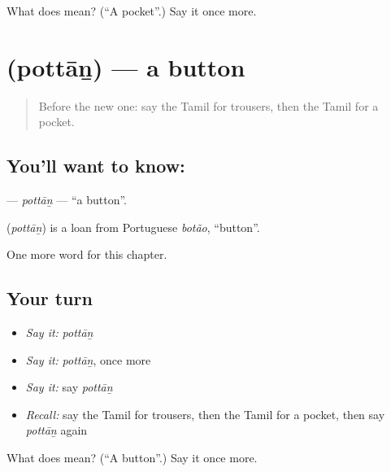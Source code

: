 \begin{tcolorbox}[breakable,colback=teal!4,colframe=teal!35!black,title={Before you move on}]
What does  mean? (\textquotedblleft{}A pocket\textquotedblright{}.) Say it once more.
\end{tcolorbox}
\section[\texorpdfstring{\ta{பொத்தான்} (pottāṉ)}{பொத்தான் (pottāṉ)}]{ (pottāṉ) — a button}

\label{lesson:TA-C242-pottan}



\begin{quote}
Before the new one: say the Tamil for trousers, then the Tamil for a pocket.
\end{quote}

\subsection*{You'll want to know: }
\textbf{} — \emph{pottāṉ} — \textquotedblleft{}a button\textquotedblright{}.

\begin{cousinweb}
\textbf{} (\emph{pottāṉ}) is a loan from Portuguese \emph{botão}, \textquotedblleft{}button\textquotedblright{}.
\end{cousinweb}

\begin{grammarlens}[title={What you've built}]
One more word for this chapter.
\end{grammarlens}

\subsection*{Your turn}
\begin{itemize}
\raggedright
  \item \emph{Say it:} \emph{pottāṉ}
  \item \emph{Say it:} \emph{pottāṉ}, once more
  \item \emph{Say it:} say \emph{pottāṉ}
  \item \emph{Recall:} say the Tamil for trousers, then the Tamil for a pocket, then say \emph{pottāṉ} again
\end{itemize}

\begin{tcolorbox}[breakable,colback=teal!4,colframe=teal!35!black,title={Before you move on}]
What does  mean? (\textquotedblleft{}A button\textquotedblright{}.) Say it once more.
\end{tcolorbox}
